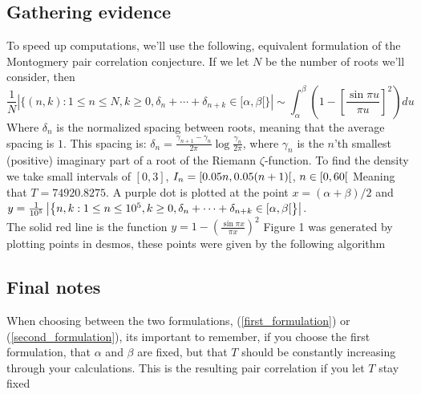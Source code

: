 \subsection{Gathering evidence}
To speed up computations, we'll use the following, equivalent formulation of the Montogmery pair 
correlation conjecture. If we let $N$ be the number of roots we'll consider, then
\begin{equation}\label{second_formulation}
\frac 1 N |\{(n,k):1\leq n\leq N, k\geq 0,\delta_n+\cdots+\delta_{n+k}\in[\alpha,\beta[\}|
\sim\int_\alpha^\beta 
\left(1-\left[\frac{\sin \pi u}{\pi u}\right]^2\right)du
\end{equation}
Where $\delta_n$ is the normalized spacing between roots, meaning that the average spacing is $1$. 
This spacing is: $\delta_n=\frac{\gamma_{n+1}-\gamma_n}{2\pi}\log{\frac{\gamma_n}{2\pi}}$, 
where $\gamma_n$ is the $n$'th smallest (positive) imaginary part of a root 
of the Riemann $\zeta$-function. To find the density we take small intervals of $[0,3]$, 
$I_n=[0.05n,\space0.05(n+1)[$, $n\in[0,\space60[$
Meaning that $T=74920.8275$. A purple dot is plotted at the point $x=(\alpha+\beta)/2$ and 
$y=\frac{1}{10^5}\left|\left\{n,k:\space 1\leq n\leq 10^5,k\geq 0,\delta_n+\cdots
    +\delta_{n+k}\in[\alpha,\beta[\right\}\right|$.\\
The solid red line is the function $y=1-\left(\frac{\sin\pi x}{\pi x}\right)^2$
Figure 1 was generated by plotting points in desmos, these points were given by the following 
algorithm

\subsection{Final notes}
When choosing between the two formulations, (\ref{first_formulation}) or (\ref{second_formulation}), 
its important to remember, if you choose the first formulation, that $\alpha$ and $\beta$ are fixed, 
but that $T$ should
be constantly increasing through your calculations. This is the resulting pair correlation if you 
let $T$ stay fixed
